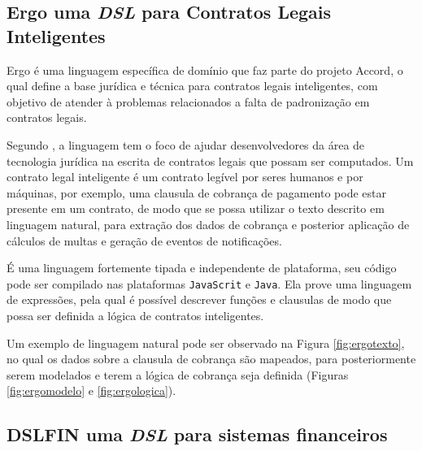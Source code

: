 






\newpage
\subsection{Ergo uma \textit{DSL} para Contratos Legais Inteligentes}
\label{ergo}

Ergo é uma linguagem específica de domínio que faz parte do projeto Accord, o qual define a base jurídica e técnica para contratos legais inteligentes, com objetivo de atender à problemas relacionados a falta de padronização em contratos legais. 

Segundo , a linguagem tem o foco de ajudar desenvolvedores da área de tecnologia jurídica na escrita de contratos legais que possam ser computados. Um contrato legal inteligente é um contrato legível por seres humanos e por máquinas, por exemplo, uma clausula de cobrança de pagamento pode estar presente em um contrato, de modo que se possa utilizar o texto descrito em linguagem natural, para extração dos dados de cobrança e posterior aplicação de cálculos de multas e geração de eventos de notificações. 


É uma linguagem fortemente tipada e independente de plataforma, seu código pode ser compilado nas plataformas \texttt{JavaScrit} e \texttt{Java}. Ela prove uma linguagem de expressões, pela qual é possível descrever funções e clausulas de modo que possa ser definida a lógica de contratos inteligentes. 

Um exemplo de linguagem natural pode ser observado na Figura \ref{fig:ergotexto}, no qual os dados sobre a clausula de cobrança são mapeados, para posteriormente serem modelados e terem a lógica de cobrança seja definida (Figuras \ref{fig:ergomodelo} e \ref{fig:ergologica}). 







\newpage

\subsection{DSLFIN uma \textit{DSL} para sistemas financeiros}
\label{dslfin}